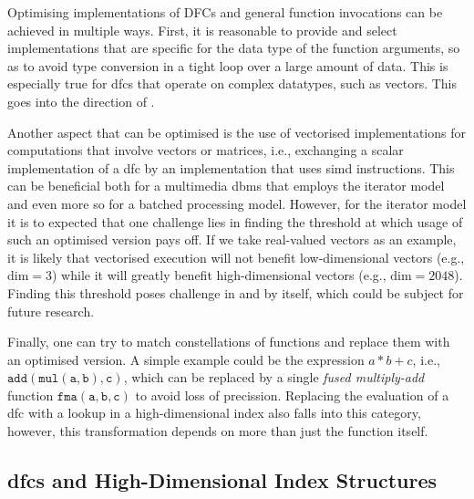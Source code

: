 Optimising implementations of DFCs and general function invocations can be achieved in multiple ways. First, it is reasonable to provide and select implementations that are specific for the data type of the function arguments, so as to avoid type conversion in a tight loop over a large amount of data. This is especially true for \acrshort{dfc}s that operate on complex datatypes, such as vectors. This goes into the direction of . 

Another aspect that can be optimised is the use of vectorised implementations for computations that involve vectors or matrices, i.e., exchanging a scalar implementation of a \acrshort{dfc} by an implementation that uses \acrshort{simd} instructions. This can be beneficial both for a multimedia \acrshort{dbms} that employs the iterator model and even more so for a batched processing model. However, for the iterator model it is to expected that one challenge lies in finding the threshold at which usage of such an optimised version pays off. If we take real-valued vectors as an example, it is likely that vectorised execution will not benefit low-dimensional vectors (e.g., $\text{dim} = 3$) while it will greatly benefit high-dimensional vectors (e.g., $\text{dim} = 2048$). Finding this threshold poses challenge in and by itself, which could be subject for future research.

Finally, one can try to match constellations of functions and replace them with an optimised version. A simple example could be the expression $a * b + c$, i.e., $\mathtt{add}(\mathtt{mul}(\mathtt{a},\mathtt{b}), \mathtt{c})$, which can be replaced by a single \emph{fused multiply-add} function $\mathtt{fma}(\mathtt{a},\mathtt{b},\mathtt{c})$ to avoid loss of precission. Replacing the evaluation of a \acrshort{dfc} with a lookup in a high-dimensional index also falls into this category, however, this transformation depends on more than just the function itself.

\subsection{\texorpdfstring{\acrshort{dfc}s}{DFCs} and High-Dimensional Index Structures}
\label{section:dfc_and_indexes}

